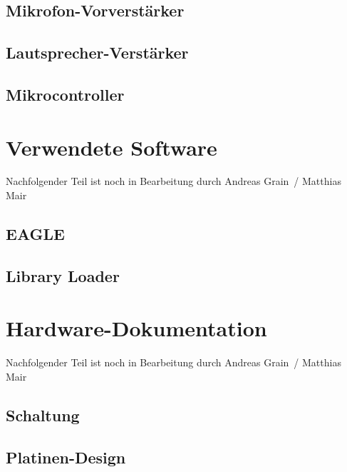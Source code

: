 \documentclass[a4paper, twoside, 12pt, openright]{memoir}
\newcommand{\AndreasGrain}{Andreas Grain}
\newcommand{\MatthiasMair}{Matthias Mair}
\newcommand{\authorName}{\AndreasGrain\ / \MatthiasMair}
\newcommand{\wip}{{\color{red}Nachfolgender Teil ist noch in Bearbeitung durch \authorName}}
\begin{document}
\section{Mikrofon-Vorverstärker}
\section{Lautsprecher-Verstärker}
\section{Mikrocontroller}

\chapter{Verwendete Software}
\wip
\section{EAGLE}
\section{Library Loader}

\chapter{Hardware-Dokumentation}
\wip
\section{Schaltung}
\section{Platinen-Design}


\cleartoverso
\end{document}
